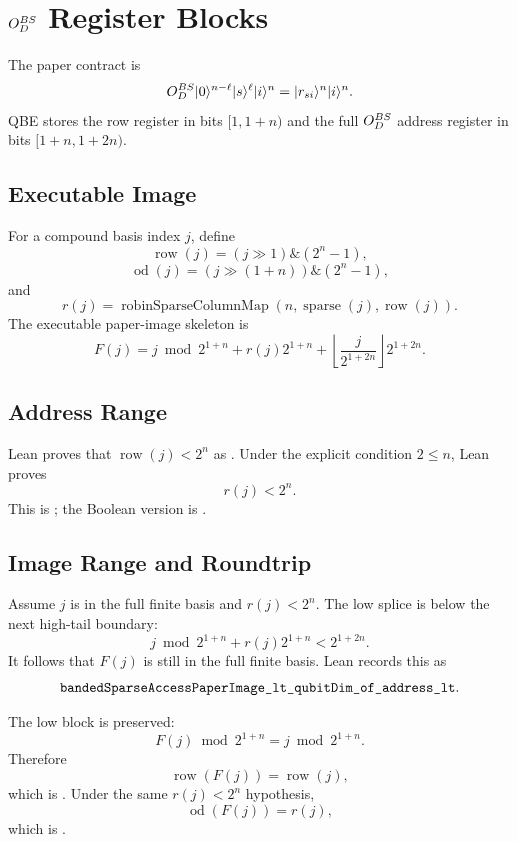 \section{\texorpdfstring{\(O_D^{BS}\)}{O\_D\^BS} Register Blocks}

The paper contract is
\[
  O_D^{BS} |0\rangle^{n-\ell}|s\rangle^\ell |i\rangle^n
  =
  |r_{si}\rangle^n |i\rangle^n .
\]
QBE stores the row register in bits \([1,1+n)\) and the full
\(O_D^{BS}\) address register in bits \([1+n,1+2n)\).

\subsection{Executable Image}

For a compound basis index \(j\), define
\[
  \operatorname{row}(j)=(j\gg1)\mathbin{\&}(2^n-1),
\]
\[
  \operatorname{od}(j)=(j\gg(1+n))\mathbin{\&}(2^n-1),
\]
and
\[
  r(j)=\operatorname{robinSparseColumnMap}
  (n,\operatorname{sparse}(j),\operatorname{row}(j)).
\]
The executable paper-image skeleton is
\[
  F(j)=j\bmod 2^{1+n}
    + r(j)2^{1+n}
    + \left\lfloor\frac{j}{2^{1+2n}}\right\rfloor 2^{1+2n}.
\]

\subsection{Address Range}

Lean proves that \(\operatorname{row}(j)<2^n\) as
.  Under the explicit
condition \(2\le n\), Lean proves
\[
  r(j)<2^n.
\]
This is ; the
Boolean version is
.

\subsection{Image Range and Roundtrip}

Assume \(j\) is in the full finite basis and \(r(j)<2^n\).  The low splice is
below the next high-tail boundary:
\[
  j\bmod 2^{1+n}+r(j)2^{1+n}<2^{1+2n}.
\]
It follows that \(F(j)\) is still in the full finite basis.  Lean records this
as
\[
  \texttt{bandedSparseAccessPaperImage\_lt\_qubitDim\_of\_address\_lt}.
\]

The low block is preserved:
\[
  F(j)\bmod 2^{1+n}=j\bmod 2^{1+n}.
\]
Therefore
\[
  \operatorname{row}(F(j))=\operatorname{row}(j),
\]
which is .  Under the same
\(r(j)<2^n\) hypothesis,
\[
  \operatorname{od}(F(j))=r(j),
\]
which is .

